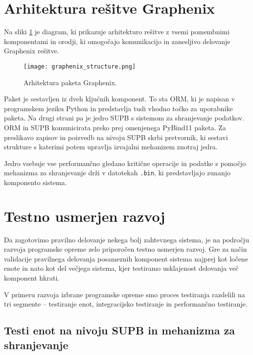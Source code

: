 \documentclass[a4paper,12pt,openright]{book}
\begin{document}
    \newpage
    \section{Arhitektura rešitve Graphenix}
    \label{graphenix_final}

    Na sliki \ref{graphenix_structure} je diagram, ki prikazuje arhitekturo rešitve z vsemi pomembnimi komponentami in orodji, ki omogočajo komunikacijo in zanesljivo delovanje Graphenix rešitve.
    
    \begin{figure}[H]
            \centerline{\texttt{[image: graphenix\_structure.png]}}
            \caption{Arhitektura paketa Graphenix.}
        \label{graphenix_structure}
    \end{figure}

    \noindent
    Paket je sestavljen iz dveh ključnih komponent. To sta ORM, ki je napisan v programskem jeziku Python in predstavlja tudi vhodno točko za uporabnike paketa. Na drugi strani pa je jedro SUPB s sistemom za shranjevanje podatkov. ORM in SUPB komunicirata preko prej omenjenega PyBind11 \cite{PYBIND11_GITHUB} paketa. Za preslikavo zapisov in poizvedb na nivoju SUPB skrbi pretvornik, ki sestavi strukture s katerimi potem upravlja izvajalni mehanizem znotraj jedra.

    Jedro vsebuje vse performančno gledano kritične operacije in podatke s pomočjo mehanizma za shranjevanje drži v datotekah {\tt .bin}, ki predstavljajo zunanjo komponento sistema.
    
    \section{Testno usmerjen razvoj}

    Da zagotovimo pravilno delovanje nekega bolj zahtevnega sistema, je na področju razvoja programske opreme zelo priporočen testno usmerjen razvoj. Gre za način validacije pravilnega delovanja posameznih komponent sistema najprej kot ločene enote in nato kot del večjega sistema, kjer testiramo usklajenost delovanja več komponent hkrati.
    
    V primeru razvoja izbrane programske opreme smo proces testiranja razdelili na tri segmente – testiranje enot, integracijsko testiranje in performančno testiranje.
   
   \subsection{Testi enot na nivoju SUPB in mehanizma za shranjevanje}
\end{document}
